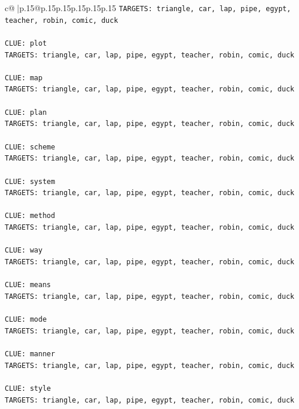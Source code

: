 \documentclass{article}
\begin{document}
{\begin{supertabular}{c@{$\;$}|p{.15\linewidth}@{}p{.15\linewidth}p{.15\linewidth}p{.15\linewidth}p{.15\linewidth}p{.15\linewidth}}
{{{\texttt{TARGETS: triangle, car, lap, pipe, egypt, teacher, robin, comic, duck} \\
\\ 
\texttt{CLUE: plot} \\
\texttt{TARGETS: triangle, car, lap, pipe, egypt, teacher, robin, comic, duck} \\
\\ 
\texttt{CLUE: map} \\
\texttt{TARGETS: triangle, car, lap, pipe, egypt, teacher, robin, comic, duck} \\
\\ 
\texttt{CLUE: plan} \\
\texttt{TARGETS: triangle, car, lap, pipe, egypt, teacher, robin, comic, duck} \\
\\ 
\texttt{CLUE: scheme} \\
\texttt{TARGETS: triangle, car, lap, pipe, egypt, teacher, robin, comic, duck} \\
\\ 
\texttt{CLUE: system} \\
\texttt{TARGETS: triangle, car, lap, pipe, egypt, teacher, robin, comic, duck} \\
\\ 
\texttt{CLUE: method} \\
\texttt{TARGETS: triangle, car, lap, pipe, egypt, teacher, robin, comic, duck} \\
\\ 
\texttt{CLUE: way} \\
\texttt{TARGETS: triangle, car, lap, pipe, egypt, teacher, robin, comic, duck} \\
\\ 
\texttt{CLUE: means} \\
\texttt{TARGETS: triangle, car, lap, pipe, egypt, teacher, robin, comic, duck} \\
\\ 
\texttt{CLUE: mode} \\
\texttt{TARGETS: triangle, car, lap, pipe, egypt, teacher, robin, comic, duck} \\
\\ 
\texttt{CLUE: manner} \\
\texttt{TARGETS: triangle, car, lap, pipe, egypt, teacher, robin, comic, duck} \\
\\ 
\texttt{CLUE: style} \\
\texttt{TARGETS: triangle, car, lap, pipe, egypt, teacher, robin, comic, duck} \\
}}}
\end{supertabular}}
\end{document}
